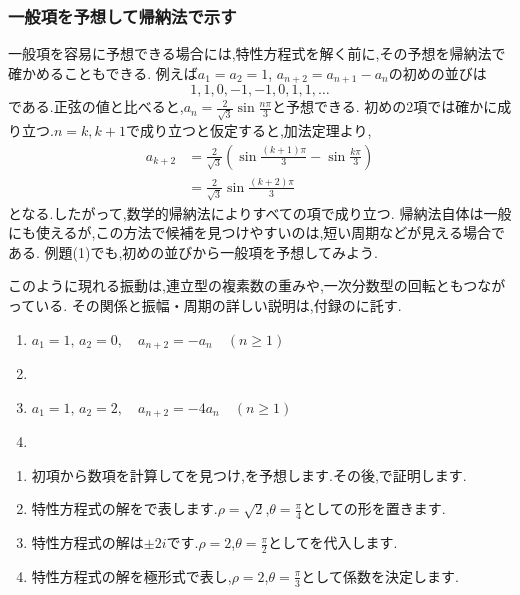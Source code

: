 \subsubsection{一般項を予想して帰納法で示す}
一般項を容易に予想できる場合には,特性方程式を解く前に,その予想を帰納法で確かめることもできる.
例えば$a_1=a_2=1$, $a_{n+2}=a_{n+1}-a_n$の初めの並びは
\[
  1,1,0,-1,-1,0,1,1,\ldots
\]
である.正弦の値と比べると,$a_n=\frac{2}{\sqrt3}\sin\frac{n\pi}{3}$と予想できる.
初めの2項では確かに成り立つ.$n=k,k+1$で成り立つと仮定すると,加法定理より,
\[
  \begin{aligned}
    a_{k+2}
    &=\frac{2}{\sqrt3}\left(\sin\frac{(k+1)\pi}{3}-\sin\frac{k\pi}{3}\right)\\
    &=\frac{2}{\sqrt3}\sin\frac{(k+2)\pi}{3}
  \end{aligned}
\]
となる.したがって,数学的帰納法によりすべての項で成り立つ.
帰納法自体は一般にも使えるが,この方法で候補を見つけやすいのは,短い周期などが見える場合である.
例題(1)でも,初めの並びから一般項を予想してみよう.

このように現れる振動は,連立型の複素数の重みや,一次分数型の回転ともつながっている.
その関係と振幅・周期の詳しい説明は,付録のに託す.

\noindent {}\par\nobreak
\begin{enumerate}[label=(\arabic*),parsep=3pt,format=\bookitemlink{example-complex-1}{problem}{hint}]
  \item $a_1=1,\,a_2=0,\quad a_{n+2}=-a_n\quad(n\ge1)$
  \item {}
  \item $a_1=1,\,a_2=2,\quad a_{n+2}=-4a_n\quad(n\ge1)$
  \item {}
\end{enumerate}

\noindent{}\par\nobreak
\begin{enumerate}[label=(\arabic*),parsep=3pt,format=\bookitemlink{example-complex-1}{hint}{answer}]
  \item 初項から数項を計算してを見つけ,を予想します.その後,で証明します.
  \item 特性方程式の解をで表します.$\rho=\sqrt2$,$\theta=\frac{\pi}{4}$としての形を置きます.
  \item 特性方程式の解は$\pm2i$です.$\rho=2$,$\theta=\frac{\pi}{2}$としてを代入します.
  \item 特性方程式の解を極形式で表し,$\rho=2$,$\theta=\frac{\pi}{3}$として係数を決定します.
\end{enumerate}

